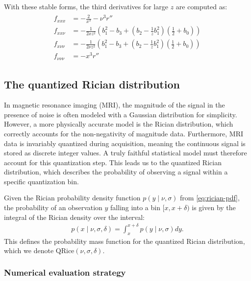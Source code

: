 \documentclass{article}
\begin{document}
With these stable forms, the third derivatives for large $z$ are computed as:
\begin{align}\label{eq:third-derivatives-large-z}
  \boxed{
    \begin{aligned}
      f_{xxx}       & = -\frac{2}{x^3} - \nu^3 r''                                                                      \\
      f_{xx\nu}     & = -\frac{1}{2 x z^2} \left( b_1^2 - b_3 + (b_2 - \frac{1}{z} b_1^2) (\frac{1}{2} + b_0) \right)   \\
      f_{x\nu\nu}   & = -\frac{1}{2 \nu z^2} \left( b_1^2 - b_3 + (b_2 - \frac{1}{z} b_1^2) (\frac{1}{2} + b_0) \right) \\
      f_{\nu\nu\nu} & = -x^3 r''
    \end{aligned}
  }
\end{align}

\subsection{The quantized Rician distribution}

In magnetic resonance imaging (MRI), the magnitude of the signal in the presence of noise is often modeled with a Gaussian distribution for simplicity.
However, a more physically accurate model is the Rician distribution, which correctly accounts for the non-negativity of magnitude data.
Furthermore, MRI data is invariably quantized during acquisition, meaning the continuous signal is stored as discrete integer values.
A truly faithful statistical model must therefore account for this quantization step.
This leads us to the quantized Rician distribution, which describes the probability of observing a signal within a specific quantization bin.

Given the Rician probability density function $p(y \mid \nu, \sigma)$ from \cref{eq:rician-pdf}, the probability of an observation $y$ falling into a bin $[x, x + \delta)$ is given by the integral of the Rician density over the interval:
%
\begin{align}\label{eq:quantized-rician-pmf}
  p(x \mid \nu, \sigma, \delta) = \int_x^{x + \delta} p(y \mid \nu, \sigma) dy.
\end{align}
%
This defines the probability mass function for the quantized Rician distribution, which we denote $\mathrm{QRice}(\nu, \sigma, \delta)$.

\subsubsection{Numerical evaluation strategy}
\end{document}
